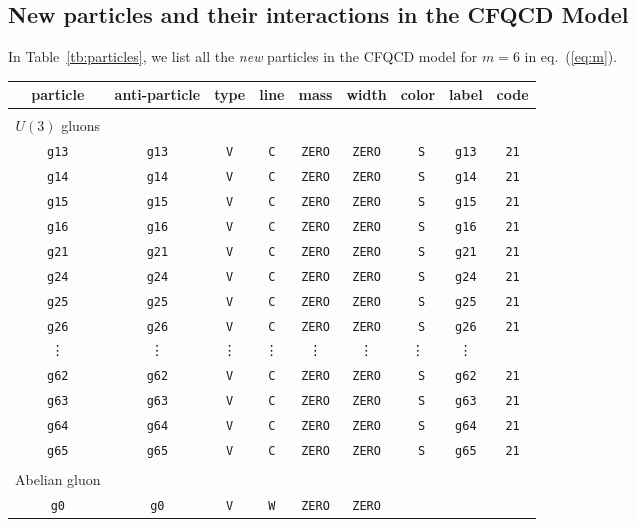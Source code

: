 \subsection{New particles and their interactions in the CFQCD Model}
\label{particle}
In Table~\ref{tb:particles}, we list all the {\it new} particles in the CFQCD
model for $m=6$ in eq.~(\ref{eq:m}).
\begin{table*}
\centering
\begin{tabular}{ccccccccc}
\hline\hline
particle & anti-particle & type & line & mass & width & color & label &
 code\\
\hline\\
$U(3)$ gluons\\
{\tt g13}&{\tt g13}& {\tt V}&{\tt C}& {\tt ZERO} &{\tt ZERO}&{\tt
			 S}&{\tt g13}&{\tt 21}\\
{\tt g14}&{\tt g14}& {\tt V}&{\tt C}& {\tt ZERO} &{\tt ZERO}&{\tt
			 S}&{\tt g14}&{\tt 21}\\
{\tt g15}&{\tt g15}& {\tt V}&{\tt C}& {\tt ZERO} &{\tt ZERO}&{\tt
			 S}&{\tt g15}&{\tt 21}\\
{\tt g16}&{\tt g16}& {\tt V}&{\tt C}& {\tt ZERO} &{\tt ZERO}&{\tt
			 S}&{\tt g16}&{\tt 21}\\
{\tt g21}&{\tt g21}& {\tt V}&{\tt C}& {\tt ZERO} &{\tt ZERO}&{\tt
			 S}&{\tt g21}&{\tt 21}\\
{\tt g24}&{\tt g24}& {\tt V}&{\tt C}& {\tt ZERO} &{\tt ZERO}&{\tt
			 S}&{\tt g24}&{\tt 21}\\
{\tt g25}&{\tt g25}& {\tt V}&{\tt C}& {\tt ZERO} &{\tt ZERO}&{\tt
			 S}&{\tt g25}&{\tt 21}\\
{\tt g26}&{\tt g26}& {\tt V}&{\tt C}& {\tt ZERO} &{\tt ZERO}&{\tt
			 S}&{\tt g26}&{\tt 21}\\
\vdots&\vdots&\vdots&\vdots&\vdots&\vdots&\vdots&\vdots&\\
{\tt g62}&{\tt g62}& {\tt V}&{\tt C}& {\tt ZERO} &{\tt ZERO}&{\tt
			 S}&{\tt g62}&{\tt 21}\\
{\tt g63}&{\tt g63}& {\tt V}&{\tt C}& {\tt ZERO} &{\tt ZERO}&{\tt
			 S}&{\tt g63}&{\tt 21}\\
{\tt g64}&{\tt g64}& {\tt V}&{\tt C}& {\tt ZERO} &{\tt ZERO}&{\tt
			 S}&{\tt g64}&{\tt 21}\\
{\tt g65}&{\tt g65}& {\tt V}&{\tt C}& {\tt ZERO} &{\tt ZERO}&{\tt
			 S}&{\tt g65}&{\tt 21}\\\\
Abelian gluon\\
{\tt g0}&{\tt g0}& {\tt V}&{\tt W}& {\tt ZERO} &{\tt ZERO}&{\tt
}
\end{tabular}
\end{table*}
